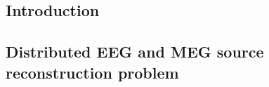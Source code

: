 \subsection{Introduction}

\newpage
\subsection{Distributed EEG and MEG source reconstruction problem}
